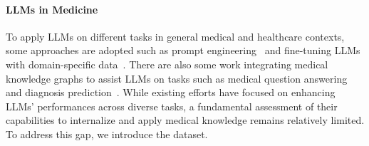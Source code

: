 \paragraph{LLMs in Medicine}
To apply LLMs on different tasks in general medical and healthcare contexts, some approaches are adopted such as prompt engineering~\cite{shi2024ehragent, chen2024cod, singhal2025toward} and fine-tuning LLMs with domain-specific data~\cite{singhal2025toward, xu2023baize, xie2024me, chen2023meditron70b, shi2024mgh, xiong2023doctorglm, zhao2024helene}.
There are also some work integrating medical knowledge graphs to assist LLMs on tasks such as medical question answering~\cite{yang2024kg, yasunaga2022deep} and diagnosis prediction~\cite{afshar2024role, gao2023leveraging}.
While existing efforts have focused on enhancing LLMs' performances across diverse tasks, a fundamental assessment of their capabilities to internalize and apply medical knowledge remains relatively limited. To address this gap, we introduce the \mkj dataset.
